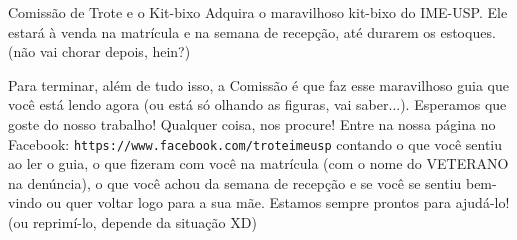 \begin{secao}{Comissão de Trote e o Kit-bixo}
Adquira o maravilhoso kit-bixo do IME-USP. Ele estará à venda na matrícula e na
semana de recepção, até durarem os estoques. (não vai chorar depois, hein?)

Para terminar, além de tudo isso, a Comissão é que faz esse maravilhoso guia que
você está lendo agora (ou está só olhando as figuras, vai saber...). Esperamos
que goste do nosso trabalho! Qualquer coisa, nos procure! Entre na nossa página
no Facebook: {\tt https://www.facebook.com/troteimeusp} contando o que você 
sentiu ao ler o guia, o que fizeram com você na matrícula (com o nome do 
VETERANO na denúncia), o que
você achou da semana de recepção e se você se sentiu bem-vindo ou quer voltar logo
para a sua mãe. Estamos sempre prontos para ajudá-lo! (ou reprimí-lo, depende
da situação XD)

\end{secao}

